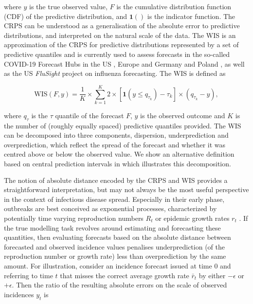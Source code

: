 \documentclass[10pt,letterpaper]{article}
\begin{document}
where $y$ is the true observed value, $F$ is the cumulative distribution function (CDF) of the predictive distribution, and $\boldsymbol{1}()$ is the indicator function. The CRPS can be understood as a generalisation of the absolute error to predictive distributions, and interpreted on the natural scale of the data. The WIS is an approximation of the CRPS for predictive distributions represented by a set of predictive quantiles and is currently used to assess forecasts in the so-called COVID-19 Forecast Hubs in the US \cite{cramerCOVID19ForecastHub2020, cramerEvaluationIndividualEnsemble2021}, Europe \cite{sherrattPredictivePerformanceMultimodel2022} and Germany and Poland \cite{bracherShorttermForecastingCOVID192021, bracherNationalSubnationalShortterm2021}, as well as the US \textit{FluSight} project on influenza forecasting\cite{CdcepiFlusightforecastdata2022}. The WIS is defined as 
\begin{linenomath*}
\begin{equation}
    \text{WIS}(F, y) = \frac{1}{K} \times \sum_{k = 1}^{K} 2 \times \left[ \boldsymbol{1}(y \leq q_{\tau_k}) - \tau_k \right] \times ( q_{\tau_k} - y), 
\end{equation}
\end{linenomath*}
where $q_{\tau}$ is the $\tau$ quantile of the forecast $F$, $y$ is the observed outcome and $K$ is the number of (roughly equally spaced) predictive quantiles provided. The WIS can be decomposed into three components, dispersion, underprediction and overprediction, which reflect the spread of the forecast and whether it was centred above or below the observed value. We show an alternative definition based on central prediction intervals in  which illustrates this decomposition. 

The notion of absolute distance encoded by the CRPS and WIS provides a straightforward interpretation, but may not always be the most useful perspective in the context of infectious disease spread. Especially in their early phase, outbreaks are best conceived as exponential processes, characterized by potentially time varying reproduction numbers $R_t$ \cite{gosticPracticalConsiderationsMeasuring2020} or epidemic growth rates $r_t$ \cite{dushoffSpeedStrengthEpidemic2021}. If the true modelling task revolves around estimating and forecasting these quantities, then evaluating forecasts based on the absolute distance between forecasted and observed incidence values penalises underprediction (of the reproduction number or growth rate) less than overprediction by the same amount. For illustration, consider an incidence forecast issued at time 0 and referring to time $t$ that misses the correct average growth rate $\bar{r}_t$ by either $-\epsilon$ or $+\epsilon$. Then the ratio of the resulting absolute errors on the scale of observed incidences $y_{t}$ is
\end{document}

